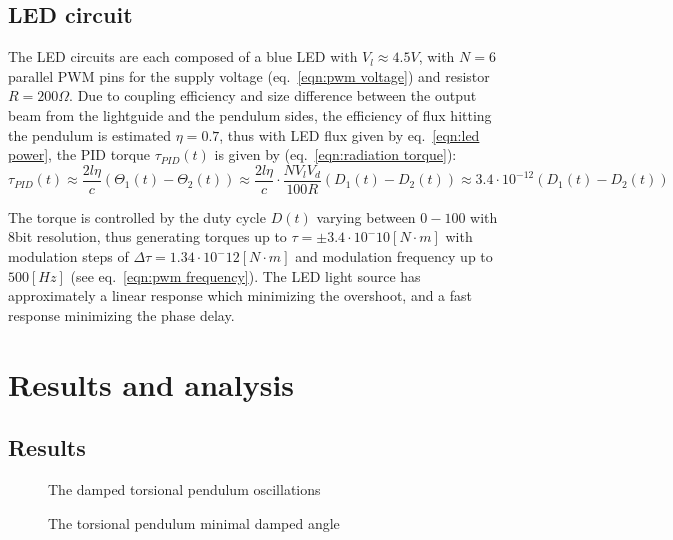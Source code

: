 \documentclass[\main/master.tex]{subfiles}
\begin{document}
\subsection{LED circuit}
The LED circuits are each composed of a blue LED with $V_l\approx 4.5V$, with $N=6$ parallel PWM pins for the supply voltage (eq.~\ref{eqn:pwm voltage}) and resistor $R = 200\Omega$. Due to coupling efficiency and size difference between the output beam from the lightguide and the pendulum sides, the efficiency of flux hitting the pendulum is estimated $\eta = 0.7$, thus with LED flux given by eq.~\ref{eqn:led power}, the PID torque $\tau_{PID}(t)$ is given by (eq.~\ref{eqn:radiation torque}):
\begin{equation}
\tau_{PID}(t) \approx \frac{2l\eta}{{c}} (\Theta_1(t) -\Theta_2(t)) \approx \frac{2l\eta}{{c}} \cdot\frac{N V_l V_d}{100R}(D_1(t) -D_2(t))  \approx   3.4\cdot 10^{-12}(D_1(t) -D_2(t)) 
\label{eqn:led torque}
\end{equation}
\par\noindent
The torque is controlled by the duty cycle $D(t)$ varying between $0-100$ with 8bit resolution, thus generating torques up to $\tau = \pm 3.4\cdot10^-{10} [N\cdot m]$ with modulation steps of $\Delta\tau = 1.34\cdot10^-{12} [N\cdot m]$ and modulation frequency up to $500[Hz]$ (see eq.~\ref{eqn:pwm frequency}). The LED light source has approximately a linear response which minimizing the overshoot, and a fast response minimizing the phase delay.

\section{Results and analysis} 
\subsection{Results}

\begin{figure}[htbp]
	\centering
	\caption[The damped torsional pendulum oscillations]{The damped torsional pendulum oscillations}
	\label{fig:measured oscillation angle}
\end{figure}
\begin{figure}[htbp]
	\centering
	\caption[The torsional pendulum minimal damped angle]{The torsional pendulum minimal damped angle}
	\label{fig:measured oscillation angle 1}
\end{figure}
\end{document}
